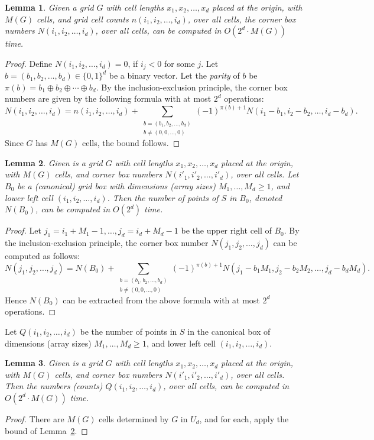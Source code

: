 \documentclass[11pt]{article}
\newtheorem{lemma}{Lemma}
\begin{document}
\begin{lemma} \label{L4}
Given a grid $G$ with cell lengths $x_1,x_2,\ldots,x_d$ placed at the origin, 
with $M(G)$ cells, and grid cell counts $n(i_1,i_2,\ldots,i_d)$,  over all
cells, the corner box numbers $N(i_1,i_2,\ldots,i_d)$, over all cells,
can be computed in $O(2^d \cdot M(G))$ time.  
\end{lemma}
\begin{proof}
Define $N(i_1,i_2,\ldots,i_d)=0$, if $i_j<0$ for some $j$. 
Let $b=(b_1,b_2,\ldots,b_d) \in \{0,1\}^d$ be a binary vector.
Let the {\em parity} of $b$ be 
$\pi(b)=b_1 \oplus b_2 \oplus \cdots \oplus b_d$. 
By the inclusion-exclusion principle, the corner box numbers
are given by the following formula with at most $2^d$ operations:
$$ N(i_1,i_2,\ldots,i_d)= n(i_1,i_2,\ldots,i_d)+
\sum_{\substack
{b=(b_1,b_2,\ldots,b_d)\\ b \neq (0,0,\ldots,0)}} 
(-1)^{\pi(b)+1} N(i_1-b_1,i_2-b_2,\ldots,i_d-b_d). $$
Since $G$ has $M(G)$ cells, the bound follows.
\end{proof}


\begin{lemma} \label{L5}
Given is a grid $G$ with cell lengths $x_1,x_2,\ldots,x_d$ placed at the origin, 
with $M(G)$ cells, and corner box numbers $N(i'_1,i'_2,\ldots,i'_d)$,
over all cells. Let $B_0$ be a (canonical) grid box with dimensions
(array sizes) $M_1,\ldots,M_d \geq 1$, and lower left cell
$(i_1,i_2,\ldots,i_d)$. Then the number of points of $S$ in $B_0$,
denoted $N(B_0)$, can be computed in $O(2^d)$ time. 
\end{lemma}
\begin{proof}
Let $j_1=i_1+M_1-1, \ldots, j_d=i_d+M_d-1$ be the upper right cell of
$B_0$. By the inclusion-exclusion principle, the corner box number
$N(j_1,j_2,\ldots,j_d)$ can be computed as follows:
$$ N(j_1,j_2,\ldots,j_d)= N(B_0)+
\sum_{\substack
{b=(b_1,b_2,\ldots,b_d)\\ b \neq (0,0,\ldots,0)}} 
(-1)^{\pi(b)+1} N(j_1-b_1 M_1,j_2-b_2 M_2,\ldots,j_d-b_d M_d). $$
Hence $N(B_0)$ can be extracted from the above formula with at most $2^d$
operations. 
\end{proof}


Let $Q(i_1,i_2,\ldots,i_d)$ be the number of points in $S$ in the
canonical box of dimensions (array sizes) $M_1,\ldots,M_d \geq 1$, 
and lower left cell $(i_1,i_2,\ldots,i_d)$.

\begin{lemma} \label{L6}
Given is a grid $G$ with cell lengths $x_1,x_2,\ldots,x_d$ placed at the origin, 
with $M(G)$ cells, and corner box numbers $N(i'_1,i'_2,\ldots,i'_d)$,
over all cells. Then the numbers (counts)  $Q(i_1,i_2,\ldots,i_d)$,
over all cells, can be computed in $O(2^d \cdot M(G))$ time. 
\end{lemma}
\begin{proof}
There are $M(G)$ cells determined by $G$ in $U_d$, and for each, apply
the bound of Lemma~\ref{L5}.
\end{proof}
\end{document}
